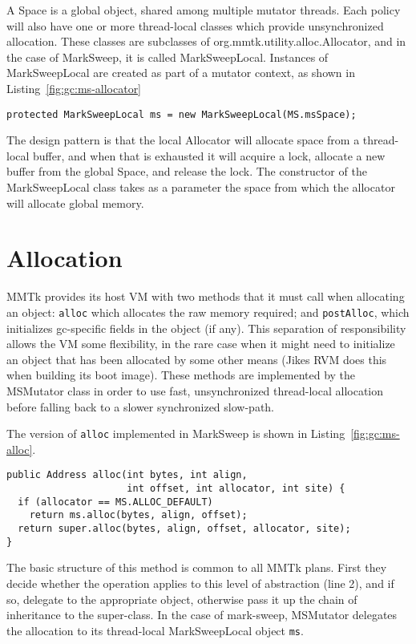 A Space is a global object, shared among multiple mutator threads.  
Each policy will also have one or more thread-local classes which provide unsynchronized allocation.  
These classes are subclasses of org.mmtk.utility.alloc.Allocator, and in the case of MarkSweep, 
it is called MarkSweepLocal.  Instances of MarkSweepLocal are created as 
part of a mutator context, as shown in Listing~\ref{fig:gc:ms-allocator}

\begin{lstlisting}[name=MSMutator.java,caption=\lstname: definition of the ms
allocator,label=fig:gc:ms-allocator]
protected MarkSweepLocal ms = new MarkSweepLocal(MS.msSpace);
\end{lstlisting}
The design pattern is that the local Allocator will allocate space 
from a thread-local buffer, and when that is exhausted it will 
acquire a lock, allocate a new buffer from the global Space, and release the lock.  
The constructor of the MarkSweepLocal class takes as a parameter the space from
which the allocator will allocate global memory.

\section{Allocation}

MMTk provides its host VM with 
two methods that it must call when allocating an object: \lstinline|alloc| which
allocates the raw memory required; and \lstinline|postAlloc|, which initializes
gc-specific fields in the object (if any).  This separation of responsibility
allows the VM some flexibility, in the rare case when it might need to
initialize an object that has been allocated by some other means (Jikes RVM
does this when building its boot image). 
These methods are implemented by the MSMutator
class in order to use fast, unsynchronized thread-local allocation before falling 
back to a slower synchronized slow-path.

The version of \lstinline|alloc| implemented in MarkSweep is shown in
Listing~\ref{fig:gc:ms-alloc}.
\begin{lstlisting}[name=MSMutator.java,
caption=\lstname: The alloc method in the mark-sweep plan.,label=fig:gc:ms-alloc] 
public Address alloc(int bytes, int align, 
                     int offset, int allocator, int site) {
  if (allocator == MS.ALLOC_DEFAULT) 
    return ms.alloc(bytes, align, offset);
  return super.alloc(bytes, align, offset, allocator, site);
}
\end{lstlisting}
The basic structure of this method is common to all MMTk plans.  
First they decide whether the operation applies to this level of abstraction 
(line 2), and if so, delegate to the
appropriate object, otherwise pass it up the chain of inheritance to the
super-class.
In the case of mark-sweep, MSMutator delegates the allocation to its
thread-local MarkSweepLocal object \lstinline|ms|.

